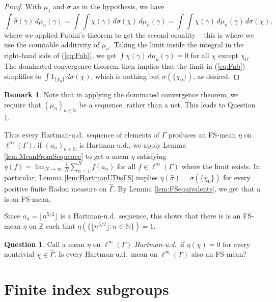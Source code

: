 \documentclass[12pt]{amsart} \usepackage{amsmath,centernot,amssymb,leftindex}
\numberwithin{theorem}{section}
\numberwithin{equation}{section}
\theoremstyle{definition}
\newtheorem{question}[theorem]{Question}
\newtheorem{remark}[theorem]{Remark}
\begin{document}
\begin{proof}
	With $\mu_{j}$ and $\sigma$ as in the hypothesis, we have
	\begin{equation}\label{eq:Fub}
		\int \hat{\sigma}(\gamma)\, d\mu_{n}(\gamma)	= \int \int  \chi(\gamma) \, d\sigma(\chi)  \, d\mu_{n}(\gamma)=\int \int \chi(\gamma)\, d\mu_{n}(\gamma) \, d\sigma(\chi), 
	\end{equation}
	where we applied Fubini's theorem to get the second equality -- this is where we use the countable additivity of $\mu_{n}$.  Taking the limit inside the integral in the right-hand side of (\ref{eq:Fub}), we get $\int \chi(\gamma)\, d\mu_{n}(\gamma)=0$ for all $\chi$ except $\chi_{0}$.  The dominated convergence theorem then implies that the limit in (\ref{eq:Fub}) simplifies to $\int 1_{\{\chi_{0}\}}\, d\sigma(\chi)$, which is nothing but $\sigma(\{\chi_{0}\})$, as desired.   
\end{proof}

\begin{remark}
	Note that in applying the dominated convergence theorem, we require that $(\mu_{n})_{n\in \mathbb N}$ be a sequence, rather than a net.  This leads to Question \ref{q:HartmanMean}.
\end{remark}

Thus every Hartman-u.d.~sequence of elements of $\Gamma$ produces an FS-mean $\eta$ on $\ell^{\infty}(\Gamma)$: if $(a_{n})_{n\in \mathbb N}$ is Hartman-u.d., we apply Lemma \ref{lem:MeanFromSequence} to get a mean $\eta$ satisfying $\eta(f)=\lim_{N\to\infty} \frac{1}{N}\sum_{n=1}^{N} f(a_{n})$ for all $f\in \ell^{\infty}(\Gamma)$ where the limit exists.  In particular, Lemma \ref{lem:HartmanUDisFS} implies $\eta(\hat{\sigma})=\sigma(\{\chi_{0}\})$ for every positive finite Radon measure on $\widehat{\Gamma}$.  By Lemma \ref{lem:FSequivalents}, we get that $\eta$ is an FS-mean.


Since $a_{n}=\lfloor n^{5/2}\rfloor$ is a Hartman-u.d.~sequence, this shows that there is is an FS-mean $\eta$ on $\mathbb Z$ such that $\eta(\{\lfloor n^{5/2} \rfloor:n\in \mathbb N\})=1$.

\begin{question}\label{q:HartmanMean}
	Call a mean $\eta$ on $\ell^{\infty}(\Gamma)$ \emph{Hartman-u.d.}~if $\eta(\chi)=0$ for every nontrivial $\chi\in\widehat{\Gamma}$. Is every Hartman-u.d.~mean on $\ell^{\infty}(\Gamma)$ also an FS-mean?
\end{question}

\section{Finite index subgroups}
\end{document}
